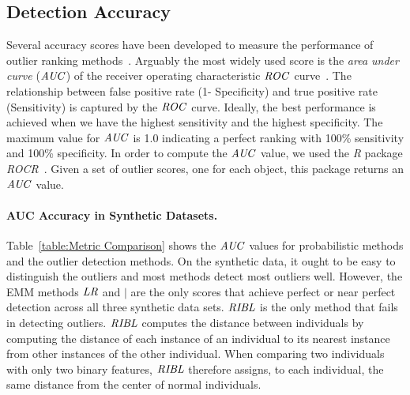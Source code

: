 {\subsection{Detection Accuracy} \label{sec:detection} Several accuracy scores have been developed to measure the performance of outlier ranking methods~\citep{aggarwal2013}. Arguably the most widely used score is the {\em area under curve} ($\it{AUC}$) of the receiver operating characteristic $\it{ROC}$ curve~\citep{Fawcett2006,Cansado2008,Muller2012}. 
		The relationship between false positive rate (1- Specificity) and true positive rate (Sensitivity) is captured by the $\it{ROC}$ curve. Ideally, the best performance is achieved when we have the highest sensitivity and the highest specificity. 
		The maximum value for $\it{AUC}$ is 1.0 indicating a perfect ranking with 100\% sensitivity and 100\% specificity. In order to compute the $\it{AUC}$ value, we used the \textit{R} package \textit{ROCR}~\citep{RROCR2012}. Given a set of outlier scores, one for each object, this package returns an $\it{AUC}$ value. 



	\paragraph{AUC Accuracy in Synthetic Datasets.}
	Table~\ref{table:Metric Comparison} shows the $\it{AUC}$ values for probabilistic methods and the outlier detection methods. On the synthetic data, it ought to be easy to distinguish the outliers and most methods detect most outliers well.  However, the EMM methods $\it{LR}$ and $\mid$ are the only scores that achieve perfect or near perfect detection across all three synthetic data sets. $\it{RIBL}$ is the only method that fails in detecting outliers. $\it{RIBL}$ computes the distance between individuals by computing the distance of each instance of an individual to its nearest instance from other instances of the other individual. When comparing two individuals with only two binary features, $\it{RIBL}$ therefore assigns, to each individual, the same distance from the center of normal individuals. 
	
}

